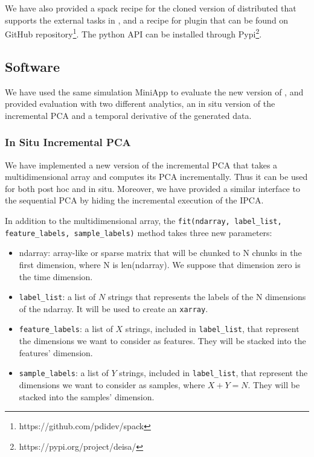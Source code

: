 We have also provided a spack recipe for the cloned version of \dask distributed that supports the external tasks in \dask, and a recipe for \deisa plugin that can be found on GitHub repository\footnote{https://github.com/pdidev/spack}. The \deisa python API can be installed through Pypi\footnote{https://pypi.org/project/deisa/}.  

\subsection{Software}
We have used the same simulation MiniApp to evaluate the new version of \deisa, and provided evaluation with two different analytics, an in situ version of the incremental PCA and a temporal derivative of the generated data.   

\subsubsection{In Situ Incremental PCA}\label{ISIPCA}

We have implemented a new version of the incremental PCA that takes a multidimensional array and computes its PCA incrementally. Thus it can be used for both post hoc and in situ. 
Moreover, we have provided a similar interface to the sequential PCA by hiding the incremental execution of the IPCA.

In addition to the multidimensional array, the \texttt{fit(ndarray, label\_list, feature\_labels, sample\_labels)} method takes three new parameters:
\begin{itemize}
    \item ndarray: array-like or sparse matrix that will be chunked to N chunks in the first dimension, where N is len(ndarray). We suppose that dimension zero is the time dimension.
    \item \texttt{label\_list}: a list of $N$ strings that represents the labels of the N dimensions of the ndarray. It will be used to create an \texttt{xarray}.
    \item \texttt{feature\_labels}: a list of $X$ strings, included in \texttt{label\_list}, that represent the dimensions we want to consider as features. They will be stacked into the features' dimension. 
    \item  \texttt{sample\_labels}: a list of $Y$ strings, included in \texttt{label\_list}, that represent the dimensions we want to consider as samples, where $X+Y=N$. They will be stacked into the samples' dimension.
\end{itemize}

